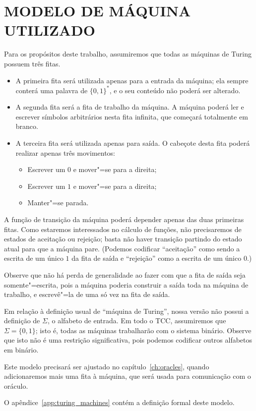 \section{MODELO DE MÁQUINA UTILIZADO}

Para os propósitos deste trabalho,
assumiremos que todas as máquinas de Turing possuem três fitas.
\begin{itemize}
    \item A primeira fita será utilizada apenas para a entrada da máquina;
        ela sempre conterá uma palavra de $\{0, 1\}^*$,
        e o seu conteúdo não poderá ser alterado.
    \item A segunda fita será a fita de trabalho da máquina.
        A máquina poderá ler e escrever símbolos arbitrários nesta fita infinita,
        que começará totalmente em branco.
    \item A terceira fita será utilizada apenas para saída.
        O cabeçote desta fita poderá realizar apenas três movimentos:
        \begin{itemize}
            \item Escrever um $0$ e mover"=se para a direita;
            \item Escrever um $1$ e mover"=se para a direita;
            \item Manter"=se parada.
        \end{itemize}
\end{itemize}

A função de transição da máquina poderá depender apenas das duas primeiras fitas.
Como estaremos interessados no cálculo de funções,
não precisaremos de estados de aceitação ou rejeição;
basta não haver transição partindo do estado atual para que a máquina pare.
(Podemos codificar ``aceitação'' como sendo a escrita de um único $1$ da fita de saída
e ``rejeição'' como a escrita de um único $0$.)

Observe que não há perda de generalidade
ao fazer com que a fita de saída seja somente"=escrita,
pois a máquina poderia construir a saída toda na máquina de trabalho,
e escrevê"=la de uma só vez na fita de saída.

Em relação à definição usual de ``máquina de Turing'',
nossa versão não possui a definição de $\Sigma$,
o alfabeto de entrada.
Em todo o TCC,
assumiremos que $\Sigma = \{0, 1\}$;
isto é, todas as máquinas trabalharão com o sistema binário.
Observe que isto não é uma restrição significativa,
pois podemos codificar outros alfabetos em binário.

Este modelo precisará ser ajustado no capítulo~\ref{ch:oracles},
quando adicionaremos mais uma fita à máquina,
que será usada para comunicação com o oráculo.

O apêndice~\ref{app:turing_machines}
contém a definição formal deste modelo.
